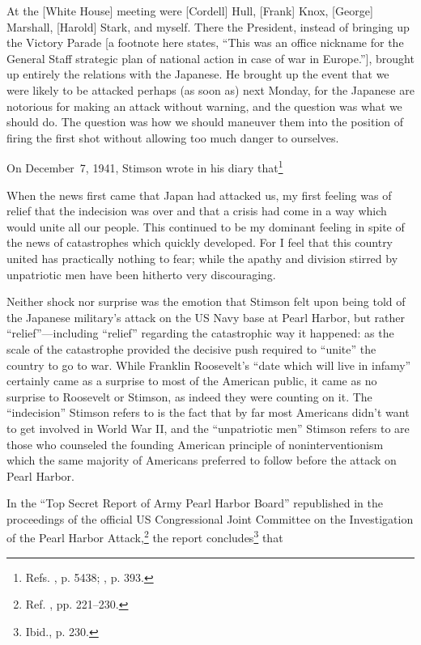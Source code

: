 \documentclass[letterpaper,12pt]{article}
\newenvironment{squote}
  {\small\quote}
  {\endquote\normalsize}
\begin{document}
\begin{squote}
At the [White House] meeting were [Cordell] Hull, [Frank] Knox, [George] Marshall, [Harold] Stark, and myself. There the President, instead of bringing up the Victory Parade [a footnote here states, ``This was an office nickname for the General Staff strategic plan of national action in case of war in Europe.''], brought up entirely the relations with the Japanese. He brought up the event that we were likely to be attacked perhaps (as soon as) next Monday, for the Japanese are notorious for making an attack without warning, and the question was what we should do. The question was how we should maneuver them into the position of firing the first shot without allowing too much danger to ourselves.
\end{squote}

On December~7, 1941, Stimson wrote in his diary that\footnote{Refs. , p. 5438; , p. 393.}

\begin{squote}
When the news first came that Japan had attacked us, my first feeling was of relief that the indecision was over and that a crisis had come in a way which would unite all our people. This continued to be my dominant feeling in spite of the news of catastrophes which quickly developed. For I feel that this country united has practically nothing to fear; while the apathy and division stirred by unpatriotic men have been hitherto very discouraging.
\end{squote}

Neither shock nor surprise was the emotion that Stimson felt upon being told of the Japanese military's attack on the US Navy base at Pearl Harbor, but rather ``relief''---including ``relief'' regarding the catastrophic way it happened: as the scale of the catastrophe provided the decisive push required to ``unite'' the country to go to war. While Franklin Roosevelt's ``date which will live in infamy'' certainly came as a surprise to most of the American public, it came as no surprise to Roosevelt or Stimson, as indeed they were counting on it. The ``indecision'' Stimson refers to is the fact that by far most Americans didn't want to get involved in World War II, and the ``unpatriotic men'' Stimson refers to are those who counseled the founding American principle of noninterventionism which the same majority of Americans preferred to follow before the attack on Pearl Harbor.

In the ``Top Secret Report of Army Pearl Harbor Board'' republished in the proceedings of the official US Congressional Joint Committee on the Investigation of the Pearl Harbor Attack,\footnote{Ref. , pp. 221--230.} the report concludes\footnote{Ibid., p. 230.} that
\end{document}
